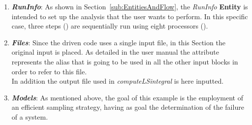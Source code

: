 \begin{enumerate}
   \item \textbf{\textit{RunInfo}}:
   As shown in Section~\ref{sub:EntitiesAndFlow}, the \textit{RunInfo} \textbf{Entity} is intended to set up the analysis
   that the user wants to perform. In this specific case, three steps () are  sequentially run
   using eight processors ().
   \item \textbf{\textit{Files}}:
   Since the driven code uses a single input file, in this Section the original input is placed. As detailed in the user manual
   the attribute   represents the alias that is going to be
   used in all the other input blocks in order to refer to this file.
   \\In addition the output file used in 
   \textit{computeLSintegral} is here inputted.
   \item \textbf{\textit{Models}}:
 As mentioned above, the goal of this example is the employment of
 an efficient sampling strategy, having as goal the determination of the
 failure of a system.


\end{enumerate}
